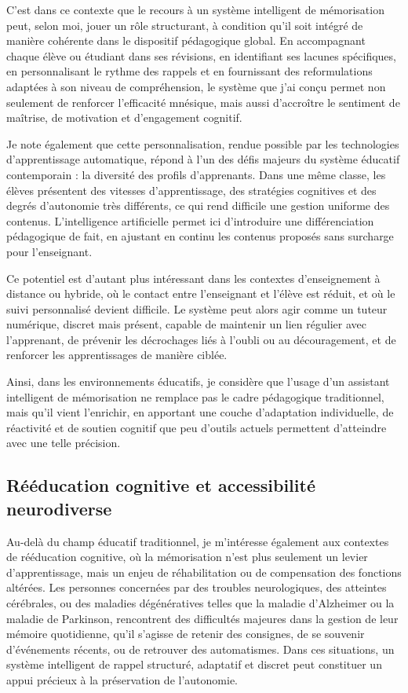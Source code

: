 \documentclass[11pt,a4paper]{report}
\begin{document}
C’est dans ce contexte que le recours à un système intelligent de mémorisation peut, selon moi, jouer un rôle structurant, à condition qu’il soit intégré de manière cohérente dans le dispositif pédagogique global. En accompagnant chaque élève ou étudiant dans ses révisions, en identifiant ses lacunes spécifiques, en personnalisant le rythme des rappels et en fournissant des reformulations adaptées à son niveau de compréhension, le système que j’ai conçu permet non seulement de renforcer l’efficacité mnésique, mais aussi d’accroître le sentiment de maîtrise, de motivation et d’engagement cognitif.

Je note également que cette personnalisation, rendue possible par les technologies d’apprentissage automatique, répond à l’un des défis majeurs du système éducatif contemporain : la diversité des profils d’apprenants. Dans une même classe, les élèves présentent des vitesses d’apprentissage, des stratégies cognitives et des degrés d’autonomie très différents, ce qui rend difficile une gestion uniforme des contenus. L’intelligence artificielle permet ici d’introduire une différenciation pédagogique de fait, en ajustant en continu les contenus proposés sans surcharge pour l’enseignant.

Ce potentiel est d’autant plus intéressant dans les contextes d’enseignement à distance ou hybride, où le contact entre l’enseignant et l’élève est réduit, et où le suivi personnalisé devient difficile. Le système peut alors agir comme un tuteur numérique, discret mais présent, capable de maintenir un lien régulier avec l’apprenant, de prévenir les décrochages liés à l’oubli ou au découragement, et de renforcer les apprentissages de manière ciblée.

Ainsi, dans les environnements éducatifs, je considère que l’usage d’un assistant intelligent de mémorisation ne remplace pas le cadre pédagogique traditionnel, mais qu’il vient l’enrichir, en apportant une couche d’adaptation individuelle, de réactivité et de soutien cognitif que peu d’outils actuels permettent d’atteindre avec une telle précision.

\subsection{Rééducation cognitive et accessibilité neurodiverse}

Au-delà du champ éducatif traditionnel, je m’intéresse également aux contextes de rééducation cognitive, où la mémorisation n’est plus seulement un levier d’apprentissage, mais un enjeu de réhabilitation ou de compensation des fonctions altérées. Les personnes concernées par des troubles neurologiques, des atteintes cérébrales, ou des maladies dégénératives telles que la maladie d’Alzheimer ou la maladie de Parkinson, rencontrent des difficultés majeures dans la gestion de leur mémoire quotidienne, qu’il s’agisse de retenir des consignes, de se souvenir d’événements récents, ou de retrouver des automatismes. Dans ces situations, un système intelligent de rappel structuré, adaptatif et discret peut constituer un appui précieux à la préservation de l’autonomie.
\end{document}
